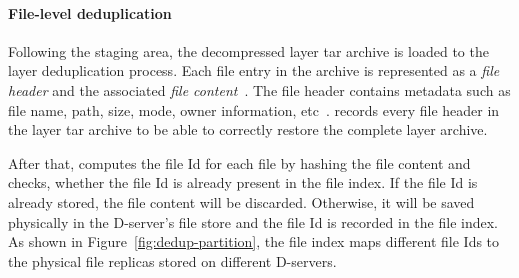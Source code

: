

%
\paragraph{File-level deduplication}
%
Following the staging area, 
the decompressed layer tar archive is loaded to the layer deduplication process.
Each file entry in the archive is represented as a \emph{file header} and the associated
\emph{file content}~\cite{xxx}.
The file header contains metadata such as file name, path, size, mode, owner information, etc~\cite{xxx}.
%
%
\sysname records every file header in the layer tar archive
to be able to correctly restore the complete layer archive.
%

After that, \sysname computes the file Id for each file by hashing the file content and 
checks, whether the file Id is already present in the file index.
If the file Id is already stored, the file content will be discarded. 
Otherwise, it will be saved physically in the D-server's file store and 
the file Id is recorded in the file index. As shown in Figure~\ref{fig:dedup-partition},
the file index maps different file Ids to the physical file replicas stored
on different D-servers.


